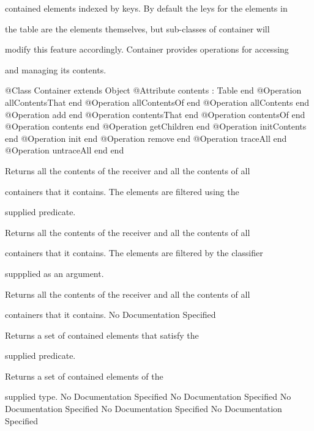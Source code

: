       contained elements indexed by keys. By default the leys for the elements in

      the table are the elements themselves, but sub-classes of container will

      modify this feature accordingly. Container provides operations for accessing

      and managing its contents.
\begin{Interface}
@Class Container extends Object
  @Attribute contents : Table end
  @Operation allContentsThat end
  @Operation allContentsOf end
  @Operation allContents end
  @Operation add end
  @Operation contentsThat end
  @Operation contentsOf end
  @Operation contents end
  @Operation getChildren end
  @Operation initContents end
  @Operation init end
  @Operation remove end
  @Operation traceAll end
  @Operation untraceAll end
end
\end{Interface}

      Returns all the contents of the receiver and all the contents of all

      containers that it contains. The elements are filtered using the

      supplied predicate.

      Returns all the contents of the receiver and all the contents of all

      containers that it contains. The elements are filtered by the classifier

      suppplied as an argument.

      Returns all the contents of the receiver and all the contents of all

      containers that it contains.
No Documentation Specified

      Returns a set of contained elements that satisfy the

      supplied predicate.

      Returns a set of contained elements of the

      supplied type.
No Documentation Specified
No Documentation Specified
No Documentation Specified
No Documentation Specified
No Documentation Specified

